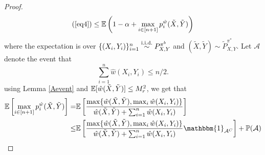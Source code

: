 \begin{proof}
\begin{align}
    (\ref{eq4}) \leq \mathbb{E}\left(1-\alpha + \max_{i \in [n+1]} p_i^{\hat{w}}(\tilde{X}, \tilde{Y}) \right) \label{eq5}
\end{align}
where the expectation is over $\{(X_i, Y_i)\}_{i=1}^n \overset{\textup{i.i.d.}}{\sim} P^{\pi^b}_{X, Y}$ and $(\tilde{X}, \tilde{Y}) \sim \tilde{P}^{\pi^*}_{X, Y}$. Let $\mathcal{A}$ denote the event that 
\[
\sum_{i=1}^n \hat{w}(X_i, Y_i) \leq n/2.
\]
using Lemma \ref{Aevent} and $\mathbb{E}[\hat{w}(\tilde{X}, \tilde{Y})] \leq M_r^2 $, we get that
\begin{align}
    \E\left[\max_{i \in [n+1]} p_i^{\hat{w}}(\tilde{X}, \tilde{Y})\right] =& \E\left[ \frac{\max \{\hat{w}(\tilde{X}, \tilde{Y}), \max_i \hat{w}(X_i, Y_i) \}}{\hat{w}(\tilde{X}, \tilde{Y}) + \sum_{i=1}^n \hat{w}(X_i, Y_i) } \right] \nonumber \\
    \leq& \E\left[ \frac{\max \{\hat{w}(\tilde{X}, \tilde{Y}), \max_i \hat{w}(X_i, Y_i) \}}{\hat{w}(\tilde{X}, \tilde{Y}) + \sum_{i=1}^n \hat{w}(X_i, Y_i) } \mathbbm{1}_{\mathcal{A}^C} \right] + \mathbb{P}(\mathcal{A}) \nonumber \\

\end{align}
\end{proof}
